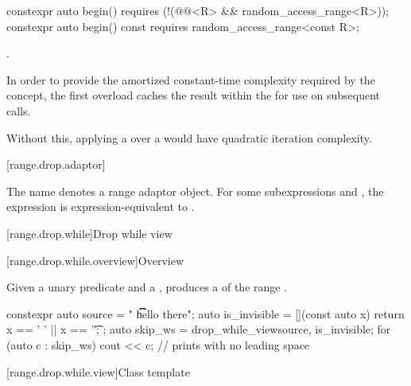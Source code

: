 %
\begin{itemdecl}
constexpr auto begin()
  requires (!(@@<R> && random_access_range<R>));
constexpr auto begin() const
  requires random_access_range<const R>;
\end{itemdecl}

\begin{itemdescr}
\pnum
\returns
{}.

\pnum
\remarks
In order to provide the amortized constant-time complexity required
by the  concept,
the first overload caches the result within the 
for use on subsequent calls.
\begin{note}
Without this,
applying a  over a 
would have quadratic iteration complexity.
\end{note}
\end{itemdescr}

[range.drop.adaptor]{}

\pnum
The name  denotes
a range adaptor object.
For some subexpressions  and ,
the expression 
is expression-equivalent to .

[range.drop.while]{Drop while view}

[range.drop.while.overview]{Overview}

\pnum
Given a unary predicate  and a  ,
 produces a 
of the range .

\pnum
\begin{example}
\begin{codeblock}
constexpr auto source = "  \t   \t   \t   hello there";
auto is_invisible = [](const auto x) { return x == ' ' || x == '\t'; };
auto skip_ws = drop_while_view{source, is_invisible};
for (auto c : skip_ws) {
  cout << c;                                    // prints  with no leading space
}
\end{codeblock}
\end{example}

[range.drop.while.view]{Class template }

